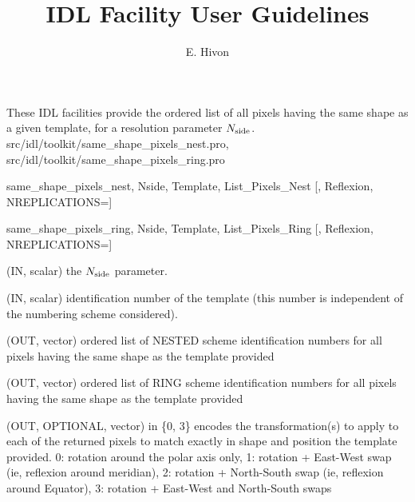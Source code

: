 
\sloppy


\title{\healpix IDL Facility User Guidelines}
 \section[same\_shape\_pixels\_XXXX]{ }
\label{idl:same_shape_pixels_xxx}
\author{E. Hivon}

\begin{facility}
{These IDL facilities provide the ordered list of all \healpix pixels having the same shape
  as a given template, for a resolution parameter ${N_{\rm side}}$.
}
{src/idl/toolkit/same\_shape\_pixels\_nest.pro, src/idl/toolkit/same\_shape\_pixels\_ring.pro}
\end{facility}

\begin{IDLformat}
{same\_shape\_pixels\_nest, Nside, Template, List\_Pixels\_Nest [, Reflexion, NREPLICATIONS=]}
\end{IDLformat}
\begin{IDLformat}
{same\_shape\_pixels\_ring, Nside, Template, List\_Pixels\_Ring [, Reflexion, NREPLICATIONS=]}
\end{IDLformat}

\begin{qualifiers}
  \begin{qulist}{} %

\item[{Nside}] (IN, scalar) the \healpix ${N_{\rm side}}$ parameter. 
\item[{Template}] (IN, scalar) identification number of the
                   template (this number is independent of the numbering scheme considered).
\item[{List\_Pixel\_Nest}] (OUT, vector) ordered list of NESTED scheme identification numbers
  for all pixels having the same shape as the template provided
\item[{List\_Pixel\_Ring}] (OUT, vector) ordered list of RING scheme identification numbers
  for all pixels having the same shape as the template provided
\item[{Reflexion}] (OUT, OPTIONAL, vector) in \{0, 3\} encodes the transformation(s) to
                   apply to each of the returned pixels to match exactly in
                   shape and position the template provided. 0: rotation around the polar axis only,
                   1: rotation + East-West swap (ie, reflexion around meridian),
                   2: rotation + North-South swap (ie, reflexion around
                   Equator), 3: rotation + East-West and North-South swaps
  \end{qulist}
\end{qualifiers}

